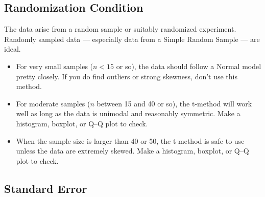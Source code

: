 \subsection*{Randomization Condition}

The data arise from a random sample or suitably randomized experiment. Randomly sampled data — especially data from a Simple Random Sample — are ideal.
\begin{tcolorbox}[title=\textbf{Normal Population Assumption}, 
  colback=yellow!10, 
  colframe=black!45, 
  coltitle=black, 
  fonttitle=\bfseries,
  breakable]

\begin{itemize}
  \item For very small samples (\(n < 15\) or so), the data should follow a Normal model pretty closely. If you do find outliers or strong skewness, don’t use this method.
  
  \item For moderate samples (\(n\) between 15 and 40 or so), the t-method will work well as long as the data is unimodal and reasonably symmetric. Make a histogram, boxplot, or Q–Q plot to check.
  
  \item When the sample size is larger than 40 or 50, the t-method is safe to use unless the data are extremely skewed. Make a histogram, boxplot, or Q–Q plot to check.
\end{itemize}

\end{tcolorbox}
\subsection*{Standard Error}

